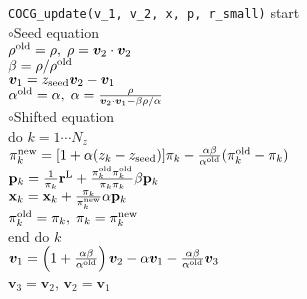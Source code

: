 \documentclass[12pt,titlepage]{article}
\renewenvironment{leftbar}{%
  \def\FrameCommand{\vrule width 1pt \hspace{0pt}}%
  \MakeFramed {\advance\hsize-\width \FrameRestore}}%
 {\endMakeFramed}
\begin{document}
\begin{leftbar}
  \noindent
  \hspace{0.5cm}
  \verb|COCG_update(v_1, v_2, x, p, r_small)| start
  \\\hspace{1.0cm}
  $\circ$Seed equation
  \\\hspace{1.0cm}
  $\rho^{\rm old} = \rho,\; \rho = {\boldsymbol v}_2 \cdot {\boldsymbol v}_2$
  \\\hspace{1.0cm}
  $\beta = \rho / \rho^{\rm old}$
  \\\hspace{1.0cm}
  ${\boldsymbol v}_1 = z_{\rm seed} {\boldsymbol v}_2 - {\boldsymbol v}_1$
  \\\hspace{1.0cm}
  $\alpha^{\rm old} = \alpha,\; 
  \alpha = \frac{\rho}{{\boldsymbol v}_2 \cdot {\boldsymbol v}_1 - \beta \rho / \alpha }$
  \\\hspace{1.0cm}
  $\circ$Shifted equation
  \\\hspace{1.0cm}
  do $k = 1 \cdots N_z$
  \\\hspace{1.5cm}
  $\pi_k^{\rm new} = [1+\alpha(z_k-z_{\rm seed})]\pi_k - \frac{\alpha \beta}{\alpha^{\rm old}}(\pi_k^{\rm old} - \pi_k)$
  \\\hspace{1.5cm}
  ${\bf p}_{k} = \frac{1}{\pi_k} {\bf r}^{\rm L} + 
  \frac{\pi^{\rm old}_k \pi^{\rm old}_k}{\pi_k \pi_k} \beta {\bf p}_{k}$
  \\\hspace{1.5cm}
  ${\bf x}_{k} = {\bf x}_{k} + \frac{\pi_k}{\pi_k^{\rm new}} \alpha {\bf p}_{k}$
  \\\hspace{1.5cm}
  $\pi_k^{\rm old} = \pi_k,\; \pi_k = \pi_k^{\rm new}$
  \\\hspace{1.0cm}
  end do $k$
  \\\hspace{1.0cm}
  ${\boldsymbol v}_1 = \left( 1 + \frac{\alpha \beta}{\alpha^{\rm old}} \right) {\boldsymbol v}_2
  - \alpha {\boldsymbol v}_1 - \frac{\alpha \beta}{\alpha^{\rm old}} {\boldsymbol v}_3$
  \\\hspace{1.0cm}
  ${\boldsymbol v}_3 = {\boldsymbol v}_2$,
  ${\boldsymbol v}_2 = {\boldsymbol v}_1$

\end{leftbar}
\end{document}
